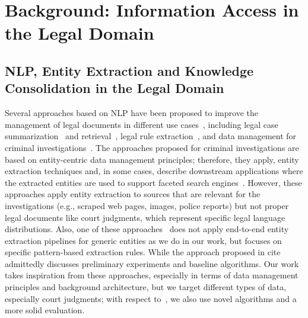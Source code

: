 \section{Background: Information Access in the Legal Domain}

\subsection{NLP, Entity Extraction and Knowledge Consolidation in the Legal Domain}
\label{sec:rw:nlp:legal}

Several approaches based on NLP have been proposed to improve the management of legal documents in different use cases~\cite{zhong2020does}, including legal case summarization~\cite{passage_based_text_summarization_LIR_2019} and retrieval~\cite{improving_legal_IR_distributional_composition_term_order_probabilities_2017,combining_bandits_lexical_analysis_2020}, legal rule extraction~\cite{dragoni2018}, and data management for criminal investigations~\cite{kejriwal2018,P_rez_2021,batini2021}. The approaches proposed for criminal investigations are based on entity-centric data management principles; therefore, they apply, entity extraction techniques and, in some cases, describe downstream applications where the extracted entities are used to support faceted search engines~\cite{kejriwal2018}. However, these approaches apply entity extraction to sources that are relevant for the investigations (e.g., scraped web pages, images, police reports) but not proper legal documents like court judgments, which represent specific legal language distributions. Also, one of these approaches~\cite{kejriwal2018} does not apply end-to-end entity extraction pipelines for generic entities as we do in our work, but focuses on specific pattern-based extraction rules. While the approach proposed in cite~\cite{batini2021} admittedly discusses preliminary experiments and baseline algorithms. Our work takes inspiration from these approaches, especially in terms of data management principles and background architecture, but we target different types of data, especially court judgments; with respect to~\cite{batini2021}, we also use novel algorithms and a more solid evaluation.                   

